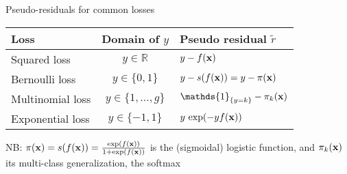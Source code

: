 \documentclass[11pt,compress,t,notes=noshow, xcolor=table]{beamer}
\begin{document}
\begin{frame}{Pseudo-residuals for common losses}

\vfill

\begin{table}[ht]
\centering
\begin{tabular}{|l|c|l|}
\hline
\textbf{Loss} & \textbf{Domain of $y$} & \textbf{Pseudo residual $\tilde r$} \\ \hline
Squared loss & $y \in \mathbb{R}$ & $y - f(\mathbf{x})$ \\ \hline
Bernoulli loss & $y \in \{0,1\}$ & $y - s(f(\mathbf{x}))=y-\pi(\mathbf{x})$ \\ \hline
Multinomial loss & $y \in \{1,\dots,g\}$ & $\mathds{1}_{\{y=k\}} - \pi_k(\xv)$ \\ \hline
Exponential loss & $y \in \{-1,1\}$ & $y\,\exp(-yf(\mathbf{x}))$ \\ \hline
\end{tabular}
\end{table}

\vfill

NB: $\pi(\mathbf{x})=s(f(\mathbf{x}))=\frac{\exp(f(\mathbf{x}))}{1+\exp(f(\mathbf{x}))}$ is the (sigmoidal) logistic function,
and $\pi_k(\mathbf{x})$ its multi-class generalization, the softmax

\end{frame}



\endlecture
\end{document}
